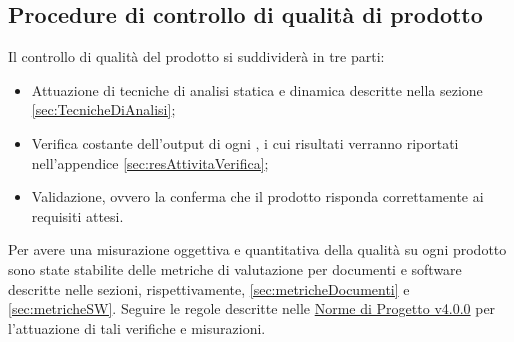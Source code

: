 \documentclass{scalatekids-article}
\begin{document}
\subsection{Procedure di controllo di qualità di prodotto}
Il controllo di qualità del prodotto si suddividerà in tre parti:
\begin{itemize}
\item{Attuazione di tecniche di analisi statica e dinamica descritte nella sezione \ref{sec:TecnicheDiAnalisi};}
\item{Verifica costante dell'output di ogni , i cui risultati verranno riportati nell'appendice \ref{sec:resAttivitaVerifica};}
\item{Validazione, ovvero la conferma che il prodotto risponda correttamente ai requisiti attesi.}
\end{itemize}
Per avere una misurazione oggettiva e quantitativa della qualità su ogni prodotto sono state stabilite delle metriche di valutazione per documenti e software descritte nelle sezioni, rispettivamente, \ref{sec:metricheDocumenti} e \ref{sec:metricheSW}. Seguire le regole descritte nelle \href{run:../Interni/NormeDiProgetto\_v4.0.0.pdf}{Norme di Progetto v4.0.0} per l'attuazione di tali verifiche e misurazioni.\\
\end{document}
